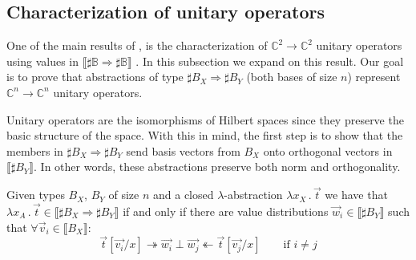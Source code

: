\documentclass[runningheads,orivec]{llncs}
\def\C{\mathbb{C}}            %
\def\Lam#1#2#3{\lambda#1_{#2}\,{.}\,#3} %
\def\eval{\twoheadrightarrow}
\def\Arr{\Rightarrow}
\def\sem#1{\llbracket#1\rrbracket}
\newcommand\B{\mathbb B}
\newcommand\basis[1]{\ensuremath{B_{ #1 }}}
\begin{document}
\subsection{Characterization of unitary operators}


One of the main results of \cite{DiazcaroGuillermoMiquelValironLICS19}, is the characterization of $\C^2\to\C^2$ unitary operators using values in $\sem{\sharp\B\Arr\sharp\B}$ \cite[Theorem IV.12]{DiazcaroGuillermoMiquelValironLICS19}. In this subsection we expand on this result. Our goal is to prove that abstractions of type $\sharp\basis{X}\Arr\sharp\basis{Y}$ (both bases of size $n$) represent $\C^n\to\C^n$ unitary operators.

Unitary operators are the isomorphisms of Hilbert spaces since they preserve the basic structure of the space. With this in mind, the first step is to show that the members in $\sharp\basis{X}\Arr\sharp{\basis{Y}}$ send basis vectors from $\basis{X}$ onto orthogonal vectors in $\sem{\sharp\basis{Y}}$. In other words, these abstractions preserve both norm and orthogonality.

\begin{lemma}\label{lem:BasesIso}
  Given types $\basis{X}$, $\basis{Y}$ of size $n$ and a closed $\lambda$-abstraction $\Lam{x}{X}{\vec t}$ we have that $\Lam{x}{A}{\vec t}\in\sem{\sharp\basis{X}\Arr\sharp\basis{Y}}$ if and only if there are value distributions $\vec w_i\in\sem{\sharp\basis{Y}}$ such that $\forall\vec v_i\in\sem{\basis{X}}$:
  \[
    \vec{t}[\vec{v_i}/x]\eval\vec{w_i}\perp\vec{w_j}\twoheadleftarrow \vec{t}[\vec{v_j}/x] \qquad \text{if } i\neq j
  \]
\end{lemma}
\end{document}
